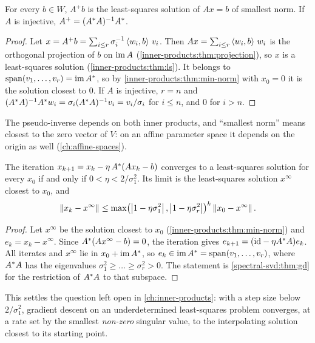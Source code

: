 \begin{notechapter}
\begin{proposition}
\label{spectral-svd:prop:pinv}
For every $b\in W$, $A^+b$ is the least-squares solution of $Ax = b$ of
smallest norm. If $A$ is injective, $A^+ = (A^{*}A)^{-1}A^{*}$.
\end{proposition}

\begin{proof}
Let $x = A^+b = \sum_{i\leq r}\sigma_i^{-1}\left\langle w_i, b \right\rangle\,v_i$. Then
$Ax = \sum_{i\leq r}\left\langle w_i, b \right\rangle\,w_i$ is the orthogonal projection of $b$
on $\operatorname{im} A$ (\cref{inner-products:thm:projection}), so $x$ is a
least-squares solution (\cref{inner-products:thm:ls}). It belongs to
$\operatorname{span}(v_1,\dots,v_r) = \operatorname{im}A^{*}$, so by
\cref{inner-products:thm:min-norm} with $x_0 = 0$ it is the solution
closest to $0$. If $A$ is injective, $r = n$ and
$(A^{*}A)^{-1}A^{*}w_i = \sigma_i(A^{*}A)^{-1}v_i = v_i/\sigma_i$ for
$i\leq n$, and $0$ for $i > n$.
\end{proof}

The pseudo-inverse depends on both inner products, and ``smallest norm''
means closest to the zero vector of $V$: on an affine parameter space it
depends on the origin as well (\cref{ch:affine-spaces}).

\begin{proposition}
\label{spectral-svd:prop:ls-gd}
The iteration $x_{k+1} = x_k - \eta\,A^{*}(Ax_k - b)$ converges to a
least-squares solution for every
$x_0$ if and only if $0 < \eta < 2/\sigma_1^2$. Its limit is the
least-squares solution $x^\infty$ closest to $x_0$, and
\[
  \left\|x_k - x^\infty\right\|\leq
  \max\bigl(\left|1 - \eta\sigma_1^2\right|, \left|1 - \eta\sigma_r^2\right|\bigr)^k
  \left\|x_0 - x^\infty\right\| .
\]
\end{proposition}

\begin{proof}
Let $x^\infty$ be the solution closest to $x_0$
(\cref{inner-products:thm:min-norm}) and $e_k = x_k - x^\infty$. Since
$A^{*}(Ax^\infty - b) = 0$, the iteration gives
$e_{k+1} = (\mathrm{id} - \eta A^{*}A)e_k$. All iterates and $x^\infty$ lie in
$x_0 + \operatorname{im}A^{*}$, so $e_k\in\operatorname{im}A^{*} = \operatorname{span}(v_1,\dots,v_r)$, where
$A^{*}A$ has the eigenvalues $\sigma_1^2\geq\dots\geq\sigma_r^2 > 0$. The
statement is \cref{spectral-svd:thm:gd} for the restriction of $A^{*}A$
to that subspace.
\end{proof}

This settles the question left open in \cref{ch:inner-products}: with a
step size below $2/\sigma_1^2$, gradient descent on an underdetermined
least-squares problem converges, at a rate set by the smallest
\emph{non-zero} singular value, to the interpolating solution closest to
its starting point.


\end{notechapter}

